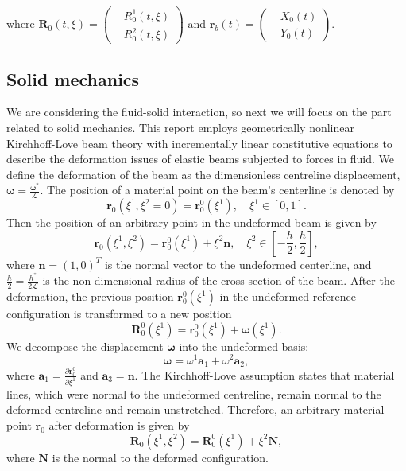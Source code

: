 \documentclass[a4paper,12pt]{article}
\begin{document}
where $\bm{R}_0(t,\xi)=\left(\begin{aligned}
	&R_0^1(t,\xi) \\
	&R_0^2(t,\xi)
\end{aligned}\right)$ and $\bm{r}_b(t)=\left(\begin{aligned}
	&X_0(t) \\
	&Y_0(t)
\end{aligned}\right)$.




\subsection{Solid mechanics}
We are considering the fluid-solid interaction, so next we will focus on the part related to solid mechanics. This report employs geometrically nonlinear Kirchhoff-Love beam theory with incrementally linear constitutive equations to describe the deformation issues of elastic beams subjected to forces in fluid. We define the deformation of the beam as the dimensionless centreline displacement, $\bm{\omega} = \frac{\bm{\omega}^*}{\mathcal{L}}$. The position of a material point on the beam's centerline is denoted by 
\begin{equation}
	\label{eqn:61}
	\mathbf{r}_0(\xi^1, \xi^2=0)=\mathbf{r}^0_0(\xi^1),\quad \xi^1\in [0,1].
\end{equation}
Then the position of an arbitrary point in the undeformed beam is given by 
\begin{equation}
	\label{eqn:62}
	\mathbf{r}_0(\xi^1, \xi^2)=\mathbf{r}^0_0(\xi^1)+\xi^2\mathbf{n},\quad \xi^2\in [-\frac{h}{2},\frac{h}{2}],
\end{equation}
where $\mathbf{n}=(1,0)^T$ is the normal vector to the undeformed centerline, and $\frac{h}{2}=\frac{h^*}{2\mathcal{L}}$ is the non-dimensional radius of the cross section of the beam. After the deformation, the previous position $\mathbf{r}^0_0(\xi^1)$ in the undeformed reference configuration is transformed to a new position 
\begin{equation}
	\label{eqn:63}
	\mathbf{R}^0_0(\xi^1)=\mathbf{r}^0_0(\xi^1)+\bm{\omega}(\xi^1).
\end{equation}
We decompose the displacement $\bm{\omega}$ into the undeformed basis:
\begin{equation}
	\label{eqn:64}
	\bm{\omega}=\omega^1\mathbf{a}_1+\omega^2\mathbf{a}_2,
\end{equation}
where $\mathbf{a}_1=\frac{\partial \mathbf{r}^0_0}{\partial\xi^1}$ and $\mathbf{a}_3=\mathbf{n}$. The Kirchhoff-Love assumption states that material lines, which were normal to the undeformed centreline, remain normal to the deformed centreline and remain unstretched. Therefore, an arbitrary material point $\mathbf{r}_0$ after deformation is given by 
\begin{equation}
	\label{eqn:65}
	\mathbf{R}_0(\xi^1,\xi^2)=\mathbf{R}^0_0(\xi^1)+\xi^2\mathbf{N},
\end{equation}
where $\mathbf{N}$ is the normal to the deformed configuration.
\end{document}
